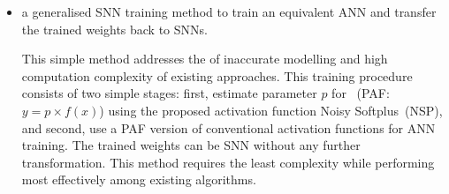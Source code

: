 \DIFaddbegin {}\DIFaddend \begin{itemize}
%	

	\item 
	a generalised SNN training method to train an equivalent ANN and transfer the trained weights back to SNNs.

	This simple method addresses the \DIFdelbegin {}\DIFdelend \DIFaddbegin {}\DIFaddend of inaccurate modelling and high computation complexity of existing approaches.
	This training procedure consists of two simple stages: first, estimate parameter $p$ for \DIFdelbegin {}\DIFdelend \DIFaddbegin {}\DIFaddend ~(PAF: $y = p \times f(x)$) using the proposed activation function Noisy Softplus~(NSP), and second, use a PAF version of conventional activation functions for ANN training. %
	The trained weights can be \DIFdelbegin {}\DIFdelend \DIFaddbegin {}\DIFaddend SNN without any further transformation.
	This method requires the least \DIFdelbegin {}\DIFdelend \DIFaddbegin {}\DIFaddend complexity while performing most effectively among existing algorithms.



\end{itemize}
